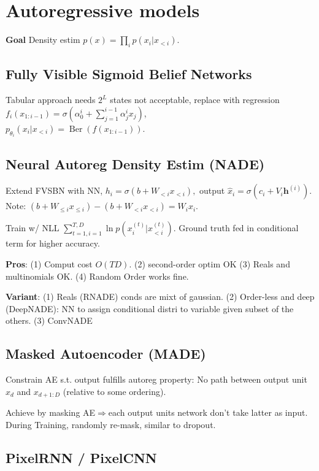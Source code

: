 \section{Autoregressive models}
\textbf{Goal} Density estim \(p({x}) = \prod_{i} p({x}_{i} | {x}_{<i})\).

\subsection*{Fully Visible Sigmoid Belief Networks}

Tabular approach needs \(2^{L}\) states not acceptable, replace with regression \(f_{i}(x_{1:i-1})= \sigma(\alpha_{0}^{i}+\sum_{j=1}^{i-1}\alpha_{j}^{i} x_{j})\),\\ \(p_{\theta_{i}}(x_{i} | x_{<i})=\operatorname{Ber}(f(x_{1:i-1}))\).


\subsection*{Neural Autoreg Density Estim (NADE)}
Extend FVSBN with NN, \({h}_{i}=\sigma({b}+{W}_{<i} {x}_{<i}),\) output \( \hat{x}_{i}=\sigma(c_{i}+V_{i} \mathbf{h}^{({i})})\).
Note: \(({b}+{W}_{\leq i} {x}_{\leq i})-({b}+{W}_{<i}{x}_{<i})={W}_{i}{x}_{i}\).

Train w/ NLL \(\sum_{t=1, i=1}^{T, D}  \ln p(x_{i}^{(t)} | x_{<i}^{(t)})\). Ground truth fed in conditional term for higher accuracy.

\textbf{Pros}: (1) Comput cost \(O(TD)\). (2) second-order optim OK (3) Reals and multinomials OK. (4) Random Order works fine.

\textbf{Variant}:
(1) Reals (RNADE) conds are mixt of gaussian.
(2) Order-less and deep (DeepNADE): NN to assign conditional distri to variable given subset of the others.
(3) ConvNADE

\subsection*{Masked Autoencoder (MADE)}

Constrain AE s.t. output fulfills autoreg property: No path between output unit \(x_d\) and  \(x_{d+1:D}\) (relative to some ordering).

Achieve by masking AE\(\Rightarrow\)each output units network don't take latter as input. During Training, randomly re-mask, similar to dropout.


\subsection*{PixelRNN / PixelCNN}

